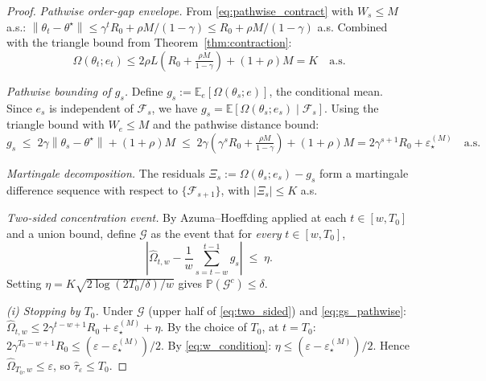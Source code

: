 \documentclass[12pt,a4paper]{article}
\newcommand{\norm}[1]{\left\lVert#1\right\rVert}
\newcommand{\Ogap}{\Omega}
\begin{document}
\begin{proof}
\emph{Pathwise order-gap envelope.}
From \eqref{eq:pathwise_contract} with $W_s \leq M$ a.s.:
$\norm{\theta_t - \theta^\star} \leq \gamma^t R_0 + \rho M/(1-\gamma) \leq
R_0 + \rho M/(1-\gamma)$ a.s. Combined with the triangle bound from
Theorem~\ref{thm:contraction}:
\[
  \Ogap(\theta_t; e_t) \leq 2\rho L\!\left(R_0 + \tfrac{\rho M}{1-\gamma}\right) + (1+\rho) M
  = K \quad\text{a.s.}
\]

\emph{Pathwise bounding of $g_s$.}
Define $g_s := \mathbb{E}_e[\Ogap(\theta_s; e)]$, the conditional mean.
Since $e_s$ is independent of $\mathcal{F}_s$, we have
$g_s = \mathbb{E}[\Ogap(\theta_s; e_s) \mid \mathcal{F}_s]$.
Using the triangle bound with $W_e \leq M$ and the pathwise distance bound:
\begin{equation}
\label{eq:gs_pathwise}
g_s \;\leq\; 2\gamma \norm{\theta_s - \theta^\star} + (1+\rho)M
\;\leq\; 2\gamma(\gamma^s R_0 + \tfrac{\rho M}{1-\gamma}) + (1+\rho)M
= 2\gamma^{s+1} R_0 + \varepsilon_\star^{(M)} \quad\text{a.s.}
\end{equation}

\emph{Martingale decomposition.}
The residuals $\Xi_s := \Ogap(\theta_s; e_s) - g_s$ form a martingale
difference sequence with respect to $\{\mathcal{F}_{s+1}\}$, with
$|\Xi_s| \leq K$ a.s.

\emph{Two-sided concentration event.}
By Azuma--Hoeffding applied at each $t \in [w, T_0]$ and a union bound,
define $\mathcal{G}$ as the event that for \emph{every} $t \in [w, T_0]$,
\begin{equation}
\label{eq:two_sided}
\left|\widehat{\Ogap}_{t,w} - \frac{1}{w}\sum_{s=t-w}^{t-1} g_s\right|
\;\leq\; \eta.
\end{equation}
Setting $\eta = K\sqrt{2 \log(2 T_0 / \delta) / w}$ gives
$\mathbb{P}(\mathcal{G}^c) \leq \delta$.

\emph{(i) Stopping by $T_0$.}
Under $\mathcal{G}$ (upper half of \eqref{eq:two_sided}) and \eqref{eq:gs_pathwise}:
$\widehat{\Ogap}_{t,w} \leq 2\gamma^{t-w+1} R_0 + \varepsilon_\star^{(M)} + \eta$.
By the choice of $T_0$, at $t = T_0$:
$2\gamma^{T_0-w+1} R_0 \leq (\varepsilon - \varepsilon_\star^{(M)})/2$.
By \eqref{eq:w_condition}: $\eta \leq (\varepsilon - \varepsilon_\star^{(M)})/2$.
Hence $\widehat{\Ogap}_{T_0, w} \leq \varepsilon$, so $\hat\tau_\varepsilon \leq T_0$.


\end{proof}
\end{document}
